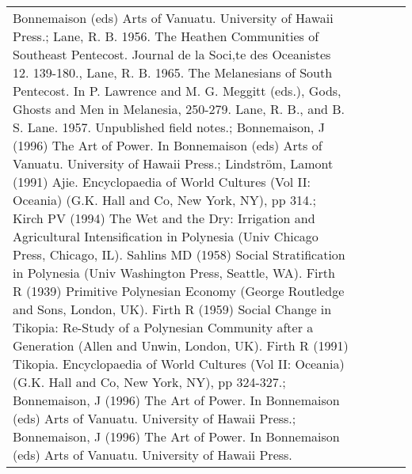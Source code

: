 \begin{table}[ht]
\begin{tabular}{p{5cm}p{2cm}p{2cm}p{2cm}p{2cm}}
Bonnemaison (eds) Arts of Vanuatu. University of Hawaii Press.; Lane, R. B. 1956. The Heathen Communities of Southeast Pentecost. Journal de la Soci‚te des Oceanistes 12. 139-180., Lane, R. B. 1965. The Melanesians of South Pentecost. In P. Lawrence and M. G. Meggitt (eds.), Gods, Ghosts and Men in Melanesia, 250-279. Lane, R. B., and B. S. Lane. 1957. Unpublished field notes.; Bonnemaison, J (1996) The Art of Power. In Bonnemaison (eds) Arts of Vanuatu. University of Hawaii Press.; Lindström, Lamont (1991) Ajie. Encyclopaedia of World Cultures (Vol II: Oceania) (G.K. Hall and Co, New York, NY), pp 314.; Kirch PV (1994) The Wet and the Dry: Irrigation and Agricultural Intensification in Polynesia (Univ Chicago Press, Chicago, IL). Sahlins MD (1958) Social Stratification in Polynesia (Univ Washington Press, Seattle, WA). Firth R (1939) Primitive Polynesian Economy (George Routledge and Sons, London, UK). Firth R (1959) Social Change in Tikopia: Re-Study of a Polynesian Community after a Generation (Allen and Unwin, London, UK). Firth R (1991) Tikopia. Encyclopaedia of World Cultures (Vol II: Oceania) (G.K. Hall and Co, New York, NY), pp 324-327.; Bonnemaison, J (1996) The Art of Power. In Bonnemaison (eds) Arts of Vanuatu. University of Hawaii Press.; Bonnemaison, J (1996) The Art of Power. In Bonnemaison (eds) Arts of Vanuatu. University of Hawaii Press. \\ 

\end{tabular}
\end{table}
